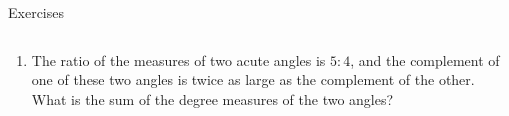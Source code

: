 \documentclass[9pt,aspectratio=169]{beamer}
\begin{document}
\begin{frame}{Exercises}
\begin{columns}[T]
\begin{column}{0.5\textwidth}
\begin{enumerate}
        \item The ratio of the measures of two acute angles is $5:4$, and the complement of one of these two angles is twice as large as the complement of the other. What is the sum of the degree measures of the two angles? %
      \end{enumerate}
    \end{column}
  \end{columns}
\end{frame}
\end{document}
